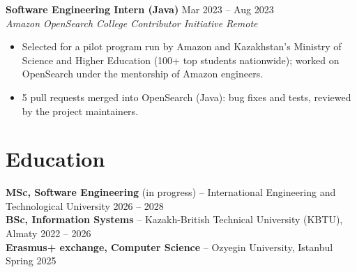 \documentclass[10pt,a4paper]{article}
\newcommand{\resumeEntry}[4]{%
  \textbf{#1} \hfill #2\\
  \textit{#3} \hfill \textit{#4}\vspace{-2pt}
}
\begin{document}
\resumeEntry{Software Engineering Intern (Java)}{Mar 2023 -- Aug 2023}{Amazon OpenSearch College Contributor Initiative}{Remote}
\begin{itemize}
  \item Selected for a pilot program run by Amazon and Kazakhstan's Ministry of Science and Higher Education (100+ top students nationwide); worked on OpenSearch under the mentorship of Amazon engineers.
  \item 5 pull requests merged into OpenSearch (Java): bug fixes and tests, reviewed by the project maintainers.
\end{itemize}

\section{Education}
\textbf{MSc, Software Engineering} (in progress) -- International Engineering and Technological University \hfill 2026 -- 2028\\
\textbf{BSc, Information Systems} -- Kazakh-British Technical University (KBTU), Almaty \hfill 2022 -- 2026\\
\textbf{Erasmus+ exchange, Computer Science} -- Ozyegin University, Istanbul \hfill Spring 2025
\end{document}

